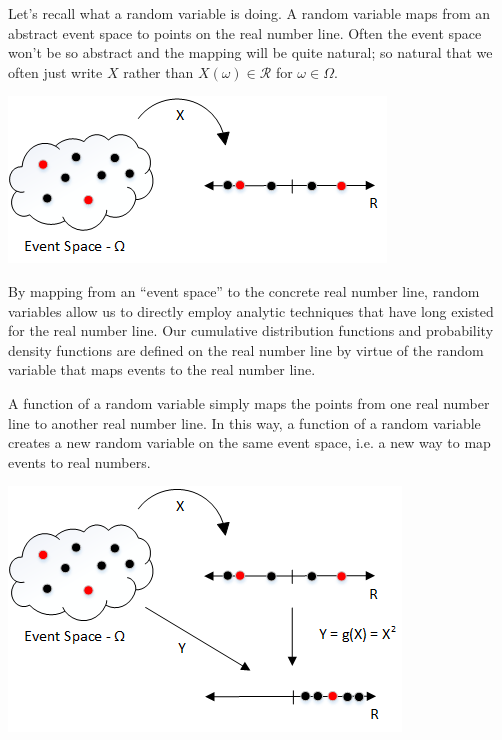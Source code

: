 \documentclass[]{article}
\begin{document}
Let's recall what a random variable is doing.
A random variable maps from an abstract event space to points on
the real number line.  Often the event space won't be so abstract
and the mapping will be quite natural; so natural that we often just
write $X$ rather than
$X(\omega) \in \mathcal{R}$ for $\omega \in \Omega$.

\includegraphics[width=\linewidth]{rv1.png}

By mapping from an ``event space'' to the concrete real number line,
random variables allow us to directly employ analytic techniques
that have long existed for the real number line.  Our
cumulative distribution functions and probability density functions
are defined on the real number line by virtue of the random variable
that maps events to the real number line.

A function of a random variable simply maps the points from one
real number line to another real number line.  In this way, a function
of a random variable creates a new random variable on the same event
space, i.e. a new way to map events to real numbers.

\includegraphics[width=\linewidth]{rv2.png}
\end{document}
